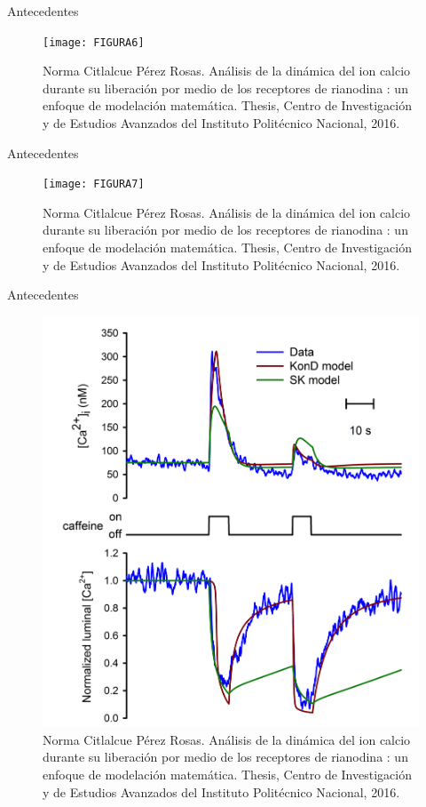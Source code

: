 \begin{frame}{Antecedentes}
	
	\begin{figure}[h]
		\texttt{[image: FIGURA6]}
		\caption{{\tiny Norma Citlalcue Pérez Rosas. Análisis de la dinámica del ion calcio durante su liberación por
				medio de los receptores de rianodina : un enfoque de modelación matemática. Thesis, Centro de
				Investigación y de Estudios Avanzados del Instituto Politécnico Nacional, 2016.}}
	\end{figure}
	
\end{frame}

\begin{frame}{Antecedentes}
	
	\begin{figure}[h]
		\texttt{[image: FIGURA7]}
		\caption{{\tiny Norma Citlalcue Pérez Rosas. Análisis de la dinámica del ion calcio durante su liberación por
				medio de los receptores de rianodina : un enfoque de modelación matemática. Thesis, Centro de
				Investigación y de Estudios Avanzados del Instituto Politécnico Nacional, 2016.}}
	\end{figure}
	
\end{frame}

\begin{frame}{Antecedentes}
	
	\begin{figure}[h]
		\includegraphics[width=.5\textwidth]{FIGURA8}
		\caption{{\tiny Norma Citlalcue Pérez Rosas. Análisis de la dinámica del ion calcio durante su liberación por
				medio de los receptores de rianodina : un enfoque de modelación matemática. Thesis, Centro de
				Investigación y de Estudios Avanzados del Instituto Politécnico Nacional, 2016.}}
	\end{figure}
	
\end{frame}
